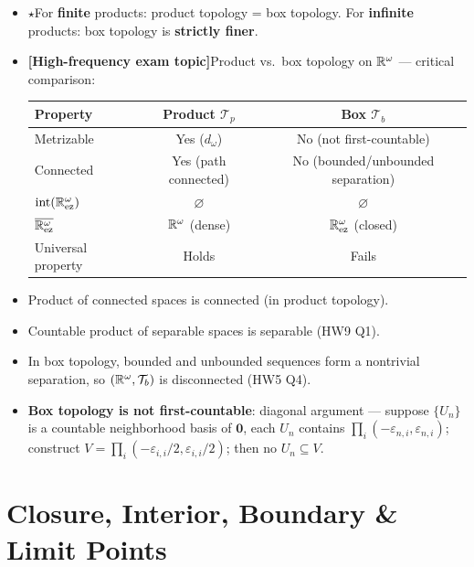 \documentclass{article}
\newcommand{\starKey}{\textcolor{red!65!black}{\textbf{$\star$}}}
\newcommand{\examKey}{\textcolor{red!65!black}{\textbf{[High-frequency exam topic]}}}
\begin{document}
\begin{itemize}
  \item \starKey For \textbf{finite} products: product topology = box topology.
  For \textbf{infinite} products: box topology is \textbf{strictly finer}.
  \item \examKey Product vs.\ box topology on $\mathbb{R}^\omega$ --- critical comparison:
  \begin{center}
    \begin{tabular}{@{}lcc@{}}
      \hline
      \textbf{Property} & \textbf{Product $\mathcal{T}_p$} & \textbf{Box $\mathcal{T}_b$} \\
      \hline
      Metrizable & Yes ($d_\omega$) & No (not first-countable) \\
      Connected & Yes (path connected) & No (bounded/unbounded separation) \\
      $\operatorname{int}(\mathbb{R}^\omega_{\mathrm{ez}})$ & $\varnothing$ & $\varnothing$ \\
      $\overline{\mathbb{R}^\omega_{\mathrm{ez}}}$ & $\mathbb{R}^\omega$ (dense) & $\mathbb{R}^\omega_{\mathrm{ez}}$ (closed) \\
      Universal property & Holds & Fails \\
      \hline
    \end{tabular}
  \end{center}

  \item Product of connected spaces is connected (in product topology).
  \item Countable product of separable spaces is separable (HW9 Q1).
  \item In box topology, bounded and unbounded sequences form a nontrivial separation,
  so $(\mathbb{R}^\omega,\mathcal{T}_b)$ is disconnected (HW5 Q4).
  \item \textbf{Box topology is not first-countable}: diagonal argument ---
  suppose $\{U_n\}$ is a countable neighborhood basis of $\mathbf{0}$, each
  $U_n$ contains $\prod_i(-\varepsilon_{n,i},\varepsilon_{n,i})$;
  construct $V=\prod_i(-\varepsilon_{i,i}/2,\varepsilon_{i,i}/2)$;
  then no $U_n\subseteq V$.
\end{itemize}

\section{Closure, Interior, Boundary \& Limit Points}
\end{document}
